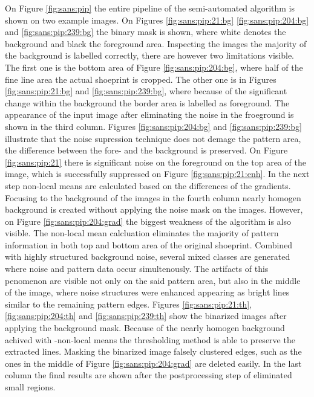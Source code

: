 \documentclass[draft,final]{vutinfth} %
\begin{document}
\par
On Figure \ref{fig:sans:pip} the entire pipeline of the semi-automated algorithm is shown on two example images.
On Figures  \ref{fig:sans:pip:21:bg} \ref{fig:sans:pip:204:bg} and \ref{fig:sans:pip:239:bg} the binary mask is shown, where white denotes the background and black the foreground area.
Inspecting the images the majority of the background is labelled correctly, there are however two limitations visible.
The first one is the bottom area of Figure \ref{fig:sans:pip:204:bg}, where half of the fine line area the actual shoeprint is cropped.
The other one is in Figures \ref{fig:sans:pip:21:bg} and \ref{fig:sans:pip:239:bg}, where because of the significant change within the background the border area is labelled as foreground.
The appearance of the input image after eliminating the noise in the froeground is shown in the third column.
Figures  \ref{fig:sans:pip:204:bg} and \ref{fig:sans:pip:239:bg} illustrate that the noise supression technique does not demage the pattern area, the difference between the fore- and the background is preserved.
On Figure \ref{fig:sans:pip:21} there is significant noise on the foreground on the top area of the image, which is successfully suppressed on Figure \ref{fig:sans:pip:21:enh}.
In the next step non-local means are calculated based on the differences of the gradients.
Focusing to the background of the images in the fourth column nearly homogen background is created without applying the noise mask on the images.
However, on Figure \ref{fig:sans:pip:204:grad} the biggest weakness of the algorithm is also visible.
The non-local mean calcluation eliminates the majority of pattern information in both top and bottom area of the original shoeprint.
Combined with highly structured background noise, several mixed classes are generated where noise and pattern data occur simultenously.
The artifacts of this penomenon are visible not only on the said pattern area, but also in the middle of the image, where noise structures were enhanced appearing as bright lines similar to the remaining pattern edges.
Figures \ref{fig:sans:pip:21:th}, \ref{fig:sans:pip:204:th} and \ref{fig:sans:pip:239:th} show the binarized images after applying the background mask.
Because of the nearly homogen background achived with -non-local means the thresholding method is able to preserve the extracted lines.
Masking the binarized image falsely clustered edges, such as the ones in the middle of Figure \ref{fig:sans:pip:204:grad} are deleted easily.
In the last column the final results are shown after the postprocessing step of eliminated small regions.
\end{document}
